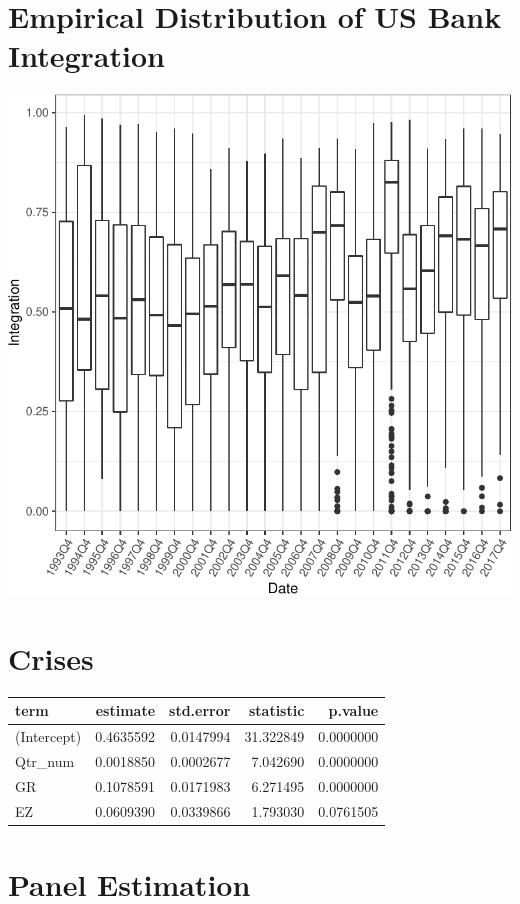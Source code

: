 \documentclass[11pt,]{article}
\begin{document}
\section{Empirical Distribution of US Bank
Integration}\label{empirical-distribution-of-us-bank-integration}

\begin{center}\includegraphics{AC_US_Bank_Int_Results_1_files/figure-latex/emp_distr_US_bank_int-1} \end{center}

\section{Crises}\label{crises}

\begin{longtable}[]{@{}lrrrr@{}}
\toprule
term & estimate & std.error & statistic & p.value\tabularnewline
\midrule
\endhead
(Intercept) & 0.4635592 & 0.0147994 & 31.322849 &
0.0000000\tabularnewline
Qtr\_num & 0.0018850 & 0.0002677 & 7.042690 & 0.0000000\tabularnewline
GR & 0.1078591 & 0.0171983 & 6.271495 & 0.0000000\tabularnewline
EZ & 0.0609390 & 0.0339866 & 1.793030 & 0.0761505\tabularnewline
\bottomrule
\end{longtable}

\section{Panel Estimation}\label{panel-estimation}
\end{document}
